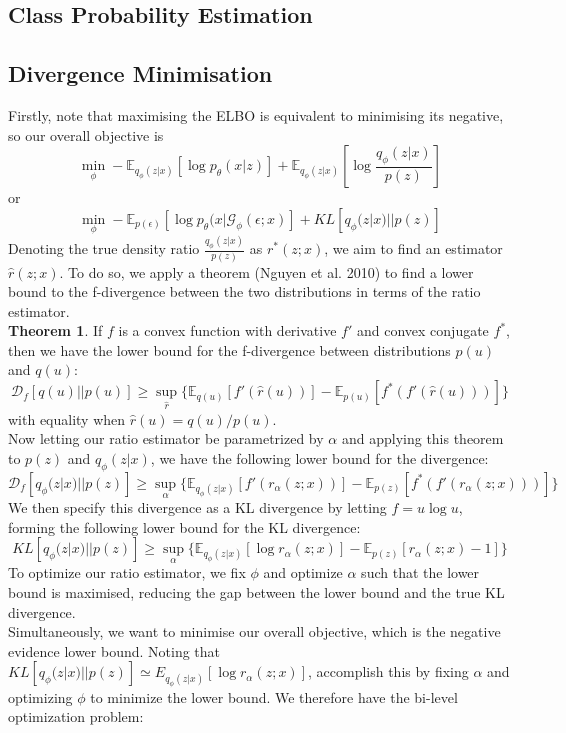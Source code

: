 \documentclass[a4paper,12pt]{article}
\begin{document}
\subsection{Class Probability Estimation}

\subsection{Divergence Minimisation}
Firstly, note that maximising the ELBO is equivalent to minimising its negative, so our overall objective is
\[\min_\phi -\mathbb{E}_{q_\phi(z|x)}\left[\log p_\theta(x|z)\right]+\mathbb{E}_{q_\phi(z|x)}\left[\log \frac{q_\phi(z|x)}{p(z)}\right]\]
or
\[\min_\phi -\mathbb{E}_{p(\epsilon)}\left[\log p_\theta(x|\mathcal{G}_\phi(\epsilon;x)\right]+KL[q_\phi(z|x)||p(z)]\]
Denoting the true density ratio $\frac{q_\phi(z|x)}{p(z)}$ as $r^*(z;x)$, we aim to find an estimator $\hat{r}(z;x)$. To do so, we apply a theorem (Nguyen et al. 2010) to find a lower bound to the f-divergence between the two distributions in terms of the ratio estimator.\\
\textbf{Theorem 1}. If $f$ is a convex function with derivative $f'$ and convex conjugate $f^*$, then we have the lower bound for the f-divergence between distributions $p(u)$ and $q(u)$:
\[\mathcal{D}_f [q(u)||p(u)]\geq \sup_{\hat{r}} \{\mathbb{E}_{q(u)}[f'(\hat{r}(u))]-\mathbb{E}_{p(u)}[f^*(f'(\hat{r}(u)))]\}\]
with equality when $\hat{r}(u)=q(u)/p(u)$.\\
Now letting our ratio estimator be parametrized by $\alpha$ and applying this theorem to $p(z)$ and $q_\phi(z|x)$, we have the following lower bound for the divergence:
\[\mathcal{D}_f[q_\phi(z|x)||p(z)]\geq \sup_\alpha \{\mathbb{E}_{q_\phi(z|x)}[f'(r_\alpha(z;x))]-\mathbb{E}_{p(z)}[f^*(f'(r_\alpha (z;x)))]\}\]
We then specify this divergence as a KL divergence by letting $f=u\log u$, forming the following lower bound for the KL divergence:
\[KL[q_\phi(z|x)||p(z)]\geq \sup_\alpha \{\mathbb{E}_{q_\phi(z|x)}[\log r_\alpha(z;x)]-\mathbb{E}_{p(z)}[r_\alpha(z;x)-1]\}\]
To optimize our ratio estimator, we fix $\phi$ and optimize $\alpha$ such that the lower bound is maximised, reducing the gap between the lower bound and the true KL divergence.\\
Simultaneously, we want to minimise our overall objective, which is the negative evidence lower bound. Noting that $KL[q_\phi(z|x)||p(z)]\simeq E_{q_\phi (z|x)}[\log r_\alpha(z;x)]$, accomplish this by fixing $\alpha$ and optimizing $\phi$ to minimize the lower bound. We therefore have the bi-level optimization problem:
\end{document}
